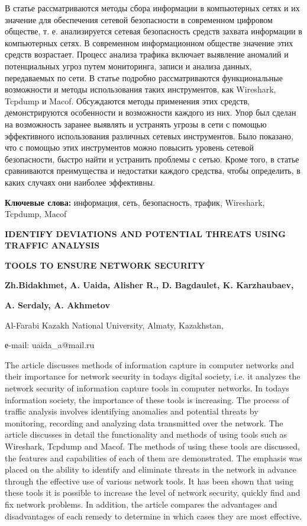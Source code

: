 В статье рассматриваются методы сбора информации в компьютерных сетях и
их значение для обеспечения сетевой безопасности в современном цифровом
обществе, т. е. анализируется сетевая безопасность средств захвата
информации в компьютерных сетях. В современном информационном обществе
значение этих средств возрастает. Процесс анализа трафика включает
выявление аномалий и потенциальных угроз путем мониторинга, записи и
анализа данных, передаваемых по сети. В статье подробно рассматриваются
функциональные возможности и методы использования таких инструментов,
как Wireshark, Tcpdump и Macof. Обсуждаются методы применения этих
средств, демонстрируются особенности и возможности каждого из них. Упор
был сделан на возможность заранее выявлять и устранять угрозы в сети с
помощью эффективного использования различных сетевых инструментов. Было
показано, что с помощью этих инструментов можно повысить уровень сетевой
безопасности, быстро найти и устранить проблемы с сетью. Кроме того, в
статье сравниваются преимущества и недостатки каждого средства, чтобы
определить, в каких случаях они наиболее эффективны.

{\bfseries Ключевые слова:} информация, сеть, безопасность, трафик,
Wireshark, Tcpdump, Macof

{\bfseries IDENTIFY DEVIATIONS AND POTENTIAL THREATS USING TRAFFIC
ANALYSIS}

{\bfseries TOOLS TO ENSURE NETWORK SECURITY}

{\bfseries Zh.Bidakhmet, A. Uaida, Alisher R., D. Bagdaulet, K.
Karzhaubaev,}

{\bfseries A. Serdaly, A. Akhmetov}

Al-Farabi Kazakh National University, Almaty, Kazakhstan,

е-mail: uaida\_a@mail.ru

The article discusses methods of information capture in computer
networks and their importance for network security in
today\textquotesingle s digital society, i.e. it analyzes the network
security of information capture tools in computer networks. In
today\textquotesingle s information society, the importance of these
tools is increasing. The process of traffic analysis involves
identifying anomalies and potential threats by monitoring, recording and
analyzing data transmitted over the network. The article discusses in
detail the functionality and methods of using tools such as Wireshark,
Tcpdump and Macof. The methods of using these tools are discussed, the
features and capabilities of each of them are demonstrated. The emphasis
was placed on the ability to identify and eliminate threats in the
network in advance through the effective use of various network tools.
It has been shown that using these tools it is possible to increase the
level of network security, quickly find and fix network problems. In
addition, the article compares the advantages and disadvantages of each
remedy to determine in which cases they are most effective.

